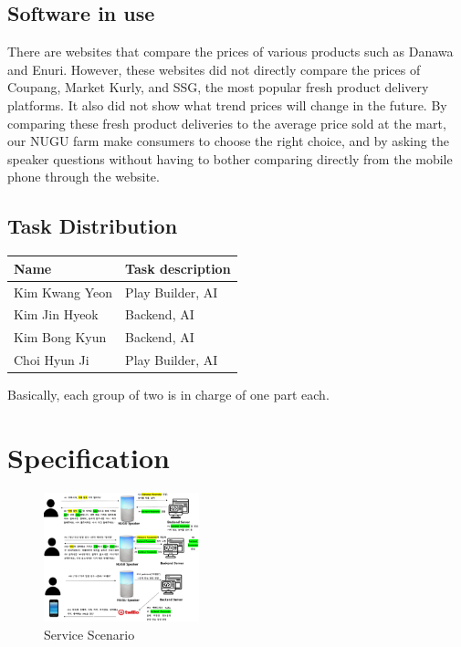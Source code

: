 \documentclass[conference]{IEEEtran}
\begin{document}
\subsection{Software in use}
There are websites that compare the prices of various products such as Danawa and Enuri. However, these websites did not directly compare the prices of Coupang, Market Kurly, and SSG, the most popular fresh product delivery platforms. It also did not show what trend prices will change in the future. By comparing these fresh product deliveries to the average price sold at the mart, our NUGU farm make consumers to choose the right choice, and by asking the speaker questions without having to bother comparing directly from the mobile phone through the website.\\

\subsection{Task Distribution}

\begin{table}[h]
\begin{tabular}{|l|l|}
\hline
Name           & Task description   \\ \hline
Kim Kwang Yeon & Play Builder,   AI \\ \hline
Kim Jin Hyeok  & Backend, AI        \\ \hline
Kim Bong Kyun  & Backend, AI        \\ \hline
Choi Hyun Ji   & Play Builder,   AI \\ \hline
\end{tabular}
\end{table}
Basically, each group of two is in charge of one part each.  


\section{Specification}
{
\begin{figure}[!htbp]
\centering
    \includegraphics[width =4.5cm]{pictures/picture3.eps}
    \hfil
\caption{Service Scenario}
\label{Service Scenario}
\end{figure}
}
\end{document}
